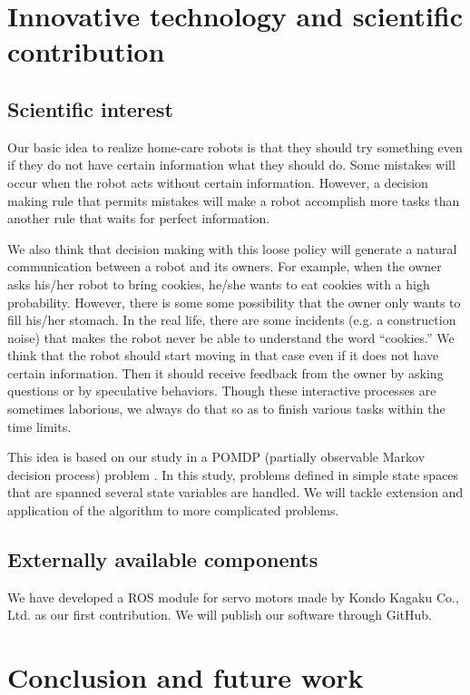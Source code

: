 \documentclass{llncs}
\begin{document}
\section{Innovative technology and scientific contribution}\label{sec:contribution}

\subsection{Scientific interest}

Our basic idea to realize home-care robots is that they
should try something even if they do not have certain information
what they should do. Some mistakes will occur when the robot
acts without certain information.
However, a decision making rule that permits mistakes will make
a robot accomplish more tasks than another rule that waits for
perfect information.

We also think that decision making with this loose policy
will generate a natural communication between a robot and its owners.
For example, when the owner asks his/her robot to bring cookies,
he/she wants to eat cookies with a high probability.
However, there is some some possibility that the owner
only wants to fill his/her stomach.
In the real life, there are some incidents
(e.g. a construction noise) that
makes the robot never be able to understand the word ``cookies.''
We think that the robot should start moving in that case
even if it does not have certain information.
Then it should receive feedback from the owner
by asking questions or by speculative behaviors.
Though these interactive processes are sometimes laborious,
we always do that so as to finish various tasks within
the time limits.

This idea is based on our study in a POMDP
(partially observable Markov decision process) problem
\cite{ueda2015}. In this study, problems defined in
simple state spaces that are spanned several state variables
are handled. We will tackle extension and application of
the algorithm to more complicated problems.


\subsection{Externally available components}

We have developed a ROS module for servo motors made
by Kondo Kagaku Co., Ltd.
as our first contribution\cite{hayashibara_kondo}.
We will publish our software through GitHub.

\section{Conclusion and future work}\label{sec:conclusion}
\end{document}
